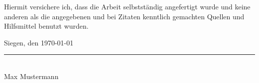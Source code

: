 
\thispagestyle{empty}%

Hiermit versichere ich, dass die Arbeit selbstständig angefertigt wurde und keine anderen als 
die angegebenen und bei Zitaten kenntlich gemachten Quellen und Hilfsmittel benutzt wurden.

\vspace{1 cm}

Siegen, den \today

\vspace{1.5 cm}
\rule{7 cm}{.1 pt}    \\
Max Mustermann